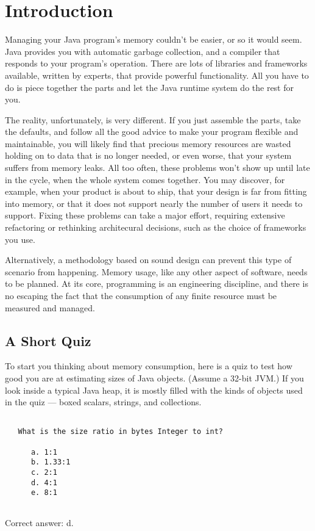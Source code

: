 
\chapter{Introduction}
\label{chapter:introduction}

Managing your Java program's memory couldn't be easier, or so it would seem.
Java provides you with automatic garbage collection, and a compiler that
responds to your program's operation. There are lots of libraries and frameworks
available, written by experts, that provide powerful functionality. All you have
to do is piece together the parts and let the Java runtime system do the rest
for you.

The reality, unfortunately, is very different.  If you just assemble the parts,
take the defaults, and follow all the good advice to make your program flexible
and maintainable, you will likely find that precious memory resources are wasted
holding on to data that is no longer needed, or even worse, that your system
suffers from memory leaks. All too often, these problems won't show up until
late in the cycle, when the whole system comes together. You may discover, for
example, when your product is about to ship, that your design is far from
fitting into memory, or that it does not support nearly the number of users it
needs to support.  Fixing these problems can take a major effort, requiring
extensive refactoring or rethinking architecural decisions, such as the choice
of frameworks you use.  

Alternatively, a methodology based on sound design can
prevent this type of scenario from happening. Memory usage, like any other
aspect of software, needs to be planned. At its core, programming is an engineering
discipline, and there is no escaping the fact that the consumption of any finite
resource must be measured and managed.


\section{A Short Quiz}

 To start you thinking about memory
consumption, here is a quiz to test how good you are at estimating sizes of Java objects. 
(Assume a 32-bit JVM.) If you look inside a typical Java heap, it is mostly filled with the kinds of
objects used in the quiz --- boxed scalars, strings, and collections.
\begin{verbatim}

   What is the size ratio in bytes Integer to int?
   
      a. 1:1
      b. 1.33:1
      c. 2:1
      d. 4:1
      e. 8:1
      
\end{verbatim}
Correct answer: d. 

